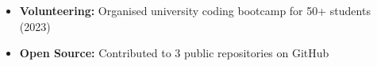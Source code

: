 \documentclass[10pt,a4paper]{article}
\newlength{\MW}\setlength{\MW}{14.7cm}   %
\newlength{\PH}\setlength{\PH}{29.7cm}   %
\begin{document}
\begin{minipage}[t][\PH][t]{\MW}
\begin{minipage}[t]{\dimexpr\MW-26pt\relax}
    \vspace{5pt}
    \begin{itemize}[leftmargin=1.2em,itemsep=2pt,topsep=2pt]
      \small
      \item {\bfseries\color{Navy}Volunteering:}
            {\color{Muted} Organised university coding bootcamp for 50+ students (2023)}
      \item {\bfseries\color{Navy}Open Source:}
            {\color{Muted} Contributed to 3 public repositories on GitHub}
    \end{itemize}

  \end{minipage}
\end{minipage}
\end{document}
